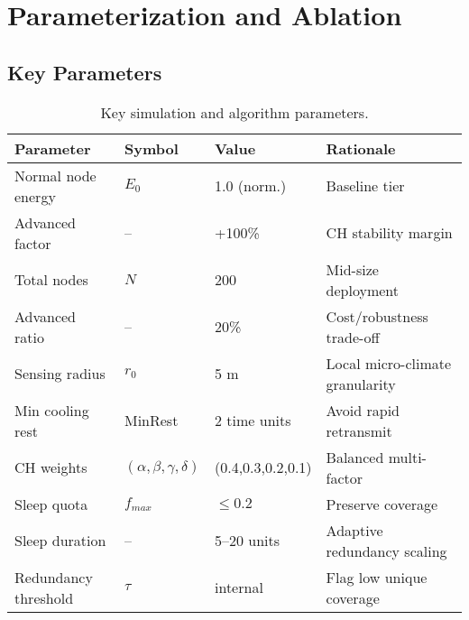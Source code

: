 \section{Parameterization and Ablation}
\subsection{Key Parameters}
\begin{table}[ht]
  \centering
  \caption{Key simulation and algorithm parameters.}
  \label{tab:parameters}
  \begin{tabular}{@{}llll@{}}
    \toprule
    Parameter & Symbol & Value & Rationale \\
    \midrule
    Normal node energy & $E_0$ & 1.0 (norm.) & Baseline tier \\
    Advanced factor & -- & +100\% & CH stability margin \\
    Total nodes & $N$ & 200 & Mid-size deployment \\
    Advanced ratio & -- & 20\% & Cost/robustness trade-off \\
    Sensing radius & $r_0$ & 5 m & Local micro-climate granularity \\
    Min cooling rest & MinRest & 2 time units & Avoid rapid retransmit \\
    CH weights & $(\alpha,\beta,\gamma,\delta)$ & (0.4,0.3,0.2,0.1) & Balanced multi-factor \\
    Sleep quota & $f_{max}$ & $\le 0.2$ & Preserve coverage \\
    Sleep duration & -- & 5--20 units & Adaptive redundancy scaling \\
    Redundancy threshold & $\tau$ & internal & Flag low unique coverage \\
    \bottomrule
  \end{tabular}
\end{table}

